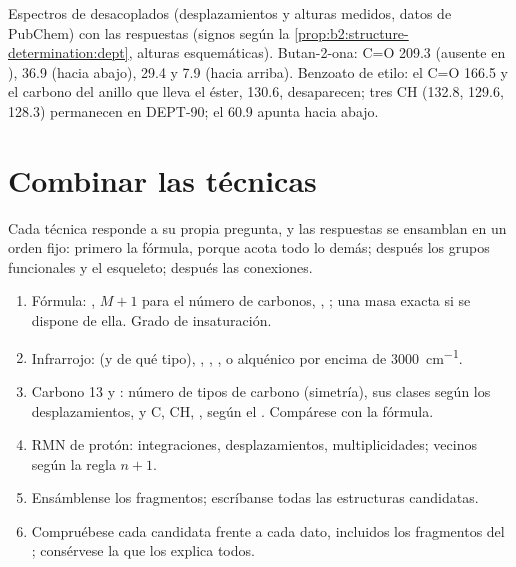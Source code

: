 \begin{omfigure}
{\small Espectros de  desacoplados (desplazamientos y alturas medidos, datos de PubChem) con las respuestas
 (signos según la \cref{prop:b2:structure-determination:dept}, alturas esquemáticas). Butan-2-ona: C=O
209.3 (ausente en ),  36.9 (hacia abajo),  29.4 y 7.9 (hacia arriba). Benzoato de etilo: el C=O 166.5 y
el carbono del anillo que lleva el éster, 130.6, desaparecen; tres CH  (132.8, 129.6, 128.3) permanecen en
DEPT-90; el  60.9 apunta hacia abajo.}
\end{omfigure}

\section{Combinar las técnicas}

Cada técnica responde a su propia pregunta, y las respuestas se ensamblan en un orden fijo: primero la fórmula,
porque acota todo lo demás; después los grupos funcionales y el esqueleto; después las
conexiones.

\begin{method}\label{met:b2:structure-determination:solve}
\begin{enumerate}
  \item Fórmula: , $M+1$ para el número de carbonos, , ; una
        masa exacta si se dispone de ella. Grado de insaturación.
  \item Infrarrojo:  (y de qué tipo), , , ,   o
        alquénico por encima de \qty{3000}{cm^{-1}}.
  \item Carbono 13 y : número de tipos de carbono (simetría), sus clases según los desplazamientos, y
        C, CH, ,  según el . Compárese con la fórmula.
  \item RMN de protón: integraciones, desplazamientos, multiplicidades; vecinos según la regla $n + 1$.
  \item Ensámblense los fragmentos; escríbanse todas las estructuras candidatas.
  \item Compruébese cada candidata frente a cada dato, incluidos los fragmentos del ; consérvese la que
        los explica todos.
\end{enumerate}
\end{method}

